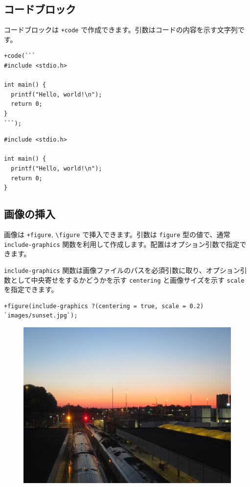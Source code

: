 \subsection{コードブロック}

コードブロックは \verb$+code$ で作成できます。引数はコードの内容を示す文字列です。

\begin{lstlisting}
+code(```
#include <stdio.h>

int main() {
  printf("Hello, world!\n");
  return 0;
}
```);
\end{lstlisting}

\begin{oframed}
  
  \begin{lstlisting}
#include <stdio.h>

int main() {
  printf("Hello, world!\n");
  return 0;
}
  \end{lstlisting}
\end{oframed}

\subsection{画像の挿入}

画像は \verb$+figure$, \verb$\figure$ で挿入できます。引数は \verb$figure$ 型の値で、通常 \verb$include-graphics$ 関数を利用して作成します。配置はオプション引数で指定できます。

\verb$include-graphics$ 関数は画像ファイルのパスを必須引数に取り、オプション引数として中央寄せをするかどうかを示す \verb$centering$ と画像サイズを示す \verb$scale$ を指定できます。

\begin{lstlisting}
+figure(include-graphics ?(centering = true, scale = 0.2) `images/sunset.jpg`);
\end{lstlisting}



\begin{figure}[h]
  \centering
  \includegraphics[keepaspectratio,scale=0.2]{images/sunset.jpg}
\end{figure}

